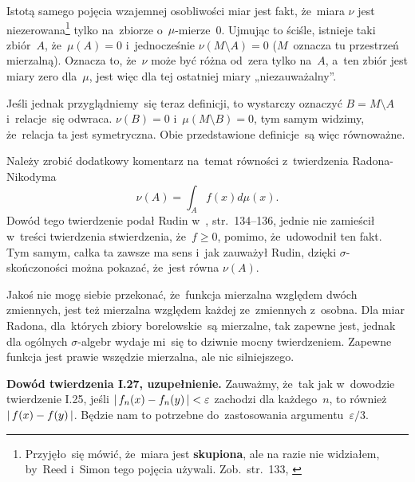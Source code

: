 \documentclass[a4paper,11pt]{article}
\begin{document}
Istotą samego pojęcia wzajemnej osobliwości miar jest fakt, że~miara
$\nu$ jest niezerowana\footnote{Przyjęło~się mówić, że~miara jest
  \textbf{skupiona}, ale na razie nie widziałem, by~Reed i~Simon tego
  pojęcia używali. Zob.~str.~133, \cite{RudinAnalizaRzeczywistaIZespolona1998}} tylko na~zbiorze
o~$\mu$-mierze~0. Ujmując to ściśle, istnieje taki zbiór~$A$,
że~$\mu( A ) = 0$ i~jednocześnie $\nu( M \setminus A ) = 0$ ($M$~oznacza
tu przestrzeń mierzalną). Oznacza to, że~$\nu$ może być różna od~zera
tylko na~$A$, a~ten zbiór jest miary zero dla~$\mu$, jest więc dla tej
ostatniej miary „niezauważalny”.

Jeśli jednak przyglądniemy~się teraz definicji, to wystarczy oznaczyć
$B = M \setminus A$ i~relacje~się odwraca. $\nu( B ) = 0$
i~$\mu( M \setminus B ) = 0$, tym samym widzimy, że~relacja ta jest
symetryczna. Obie przedstawione definicje~są więc równoważne.

\vspace{\spaceFour}



\start {} Należy zrobić dodatkowy komentarz na~temat równości
z~twierdzenia Radona-Nikodyma
\begin{equation}
  \label{eq:RS-Vol-I-s01-15}
  \nu( A ) = \int_{ A } f( x ) d\mu( x ).
\end{equation}
Dowód tego twierdzenie podał Rudin w~\cite{RudinAnalizaRzeczywistaIZespolona1998}, str.~134--136,
jednie nie zamieścił w~treści twierdzenia stwierdzenia, że~$f \geq 0$,
pomimo, że~udowodnił ten fakt. Tym samym, całka ta zawsze ma sens
i~jak zauważył Rudin, dzięki $\sigma$-skończoności można
pokazać, że~jest równa $\nu( A )$. %

\vspace{\spaceFour}



\start {} Jakoś nie mogę siebie przekonać, że~funkcja mierzalna
względem dwóch zmiennych, jest też mierzalna względem każdej
ze~zmiennych z~osobna. Dla miar Radona, dla~których zbiory
borelowskie~są mierzalne, tak zapewne jest, jednak dla ogólnych
$\sigma$-algebr wydaje mi~się to dziwnie mocny twierdzeniem.
Zapewne funkcja jest prawie wszędzie mierzalna, ale nic silniejszego.
\Dok

\vspace{\spaceFour}



\start {} \textbf{Dowód twierdzenia I.27, uzupełnienie.} Zauważmy,
że~tak jak w~dowodzie twierdzenie I.25, jeśli
$|\, {  f_{ n }( x ) - f_{ n }( y )  } \,| < \varepsilon$ zachodzi dla
każdego~$n$, to również $|\, {  f( x ) - f( y )  } \,|$. Będzie nam to
potrzebne do~zastosowania argumentu~$\varepsilon / 3$. %
\end{document}

